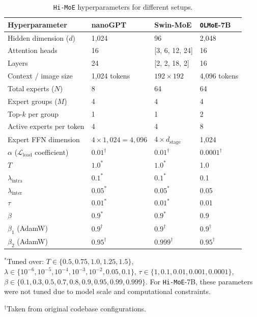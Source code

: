 \documentclass[sigconf,nonacm]{acmart}
\begin{document}
\begin{table}[!htbp]
\centering
\caption{\texttt{Hi-MoE} hyperparameters for different setups.}
\label{tab:hyperparameters}
\small
\setlength{\tabcolsep}{3pt}
\begin{tabular}{llll}
\toprule
\textbf{Hyperparameter} & \textbf{nanoGPT} & \textbf{Swin-MoE} & \textbf{\texttt{OLMoE}-7B} \\
\midrule
Hidden dimension ($d$) & 1,024 & 96 & 2,048 \\
Attention heads & 16 & [3, 6, 12, 24] & 16 \\
Layers & 24 & [2, 2, 18, 2] & 16 \\
Context / image size & 1,024 tokens & $192 \times 192$ & 4,096 tokens \\
\midrule
Total experts ($N$) & 8 & 64 & 64 \\
Expert groups ($M$) & 4 & 4 & 4 \\
Top-$k$ per group & 1 & 1 & 2 \\
Active experts per token & 4 & 4 & 8 \\
Expert FFN dimension & $4 \times 1{,}024 = 4{,}096$ & $4 \times d_{\text{stage}}$ & 1,024 \\
$\alpha$ ($\mathcal{L}_{\text{load}}$ coefficient) & $0.01^\dagger$ & $0.01^\dagger$ & $0.0001^\dagger$ \\
\midrule
$T$ & $1.0^*$ & $1.0^*$ & 1.0 \\
$\lambda_{\text{intra}}$ & $0.1^*$ & $0.1^*$ & 0.1 \\
$\lambda_{\text{inter}}$ & $0.05^*$ & $0.05^*$ & 0.05 \\
$\tau$ & $0.01^*$ & $0.01^*$ & 0.01 \\
$\beta$ & $0.9^*$ & $0.9^*$ & 0.9 \\
$\beta_1$ (AdamW) & $0.9^\dagger$ & $0.9^\dagger$ & $0.9^\dagger$ \\
$\beta_2$ (AdamW) & $0.95^\dagger$ & $0.999^\dagger$ & $0.95^\dagger$ \\
\bottomrule
\end{tabular}

\begin{flushleft}
\scriptsize $^*$Tuned over: $T \in \{0.5, 0.75, 1.0, 1.25, 1.5\}$, $\lambda \in \{10^{-6}, 10^{-5}, 10^{-4}, 10^{-3}, 10^{-2}, 0.05, 0.1\}$, $\tau \in \{1, 0.1, 0.01, 0.001, 0.0001\}$, $\beta \in \{0.1, 0.3, 0.5, 0.7, 0.8, 0.9, 0.95, 0.99, 0.999\}$. For \texttt{Hi-MoE}-7B, these parameters were not tuned due to model scale and computational constraints.

\scriptsize $^\dagger$Taken from original codebase configurations.
\end{flushleft}
\end{table}
\end{document}
